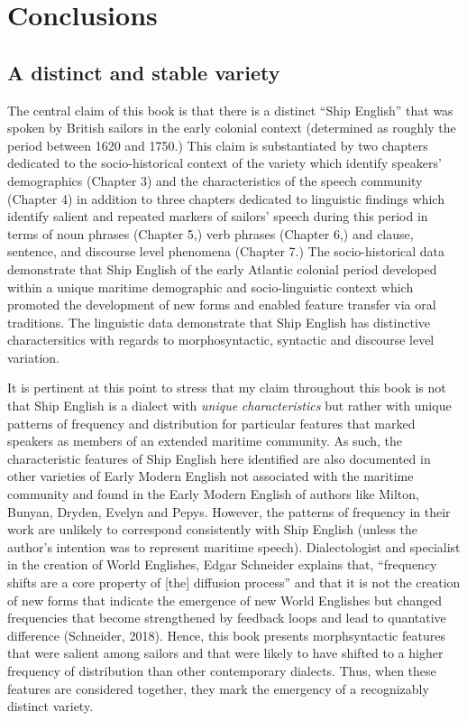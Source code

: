 \section{\textbf{Conclusions}}%

\subsection{\textbf{A} \textbf{distinct} \textbf{and} \textbf{stable} \textbf{variety}}%

  The central claim of this book is that there is a distinct “Ship English” that was spoken by British sailors in the early colonial context (determined as roughly the period between 1620 and 1750.) This claim is substantiated by two chapters dedicated to the socio-historical context of the variety which identify speakers’ demographics (Chapter 3) and the characteristics of the speech community (Chapter 4) in addition to three chapters dedicated to linguistic findings which identify salient and repeated markers of sailors’ speech during this period in terms of noun phrases (Chapter 5,) verb phrases (Chapter 6,) and clause, sentence, and discourse level phenomena (Chapter 7.) The socio-historical data demonstrate that Ship English of the early Atlantic colonial period developed within a unique maritime demographic and socio-linguistic context which promoted the development of new forms and enabled feature transfer via oral traditions. The linguistic data demonstrate that Ship English has distinctive charactersitics with regards to morphosyntactic, syntactic and discourse level variation.

  It is pertinent at this point to stress that my claim throughout this book is not that Ship English is a dialect with \textit{unique} \textit{characteristics} but rather with unique patterns of frequency and distribution for particular features that marked speakers as members of an extended maritime community. As such, the characteristic features of Ship English here identified are also documented in other varieties of Early Modern English not associated with the maritime community and found in the Early Modern English of authors like Milton, Bunyan, Dryden, Evelyn and Pepys. However, the patterns of frequency in their work are unlikely to correspond consistently with Ship English (unless the author’s intention was to represent maritime speech). Dialectologist and specialist in the creation of World Englishes, Edgar Schneider explains that, “frequency shifts are a core property of [the] diffusion process” and that it is not the creation of new forms that indicate the emergence of new World Englishes but changed frequencies that become strengthened by feedback loops and lead to quantative difference (Schneider, 2018). Hence, this book presents morphsyntactic features that were salient among sailors and that were likely to have shifted to a higher frequency of distribution than other contemporary dialects. Thus, when these features are considered together, they mark the emergency of a recognizably distinct variety. 

